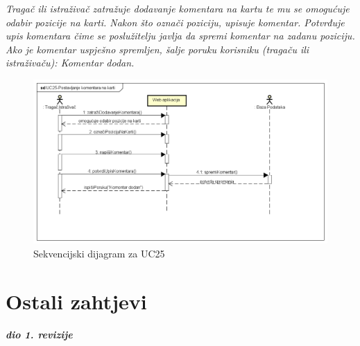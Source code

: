 				\textit{Tragač ili istraživač zatražuje dodavanje komentara na kartu te mu se omogućuje odabir pozicije na karti. Nakon što označi poziciju, upisuje komentar. Potvrđuje upis komentara čime se poslužitelju javlja da spremi komentar na zadanu poziciju. Ako je komentar uspješno spremljen, šalje poruku korisniku (tragaču ili istraživaču): Komentar dodan.}
				\begin{figure}[H]
					\includegraphics[width=\textwidth]{slike/UC25-PostavljanjeKomentaraNaKarti} %
					\caption{Sekvencijski dijagram za UC25}
					\label{fig:promjene2} %
				\end{figure}
				\eject
				
				
		\section{Ostali zahtjevi}
		
			\textbf{\textit{dio 1. revizije}}\\
		 
